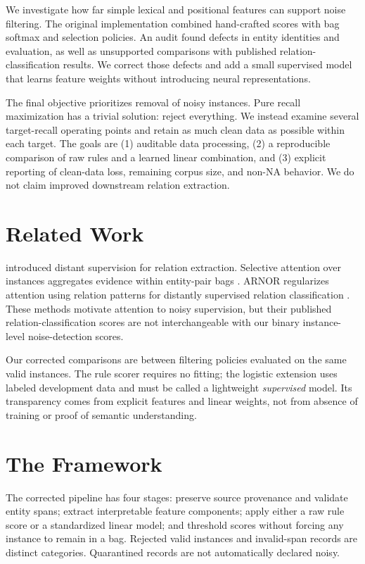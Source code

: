 \documentclass[11pt]{article}
\begin{document}
We investigate how far simple lexical and positional features can support noise filtering. The original implementation combined hand-crafted scores with bag softmax and selection policies. An audit found defects in entity identities and evaluation, as well as unsupported comparisons with published relation-classification results. We correct those defects and add a small supervised model that learns feature weights without introducing neural representations.

The final objective prioritizes removal of noisy instances. Pure recall maximization has a trivial solution: reject everything. We instead examine several target-recall operating points and retain as much clean data as possible within each target. The goals are (1) auditable data processing, (2) a reproducible comparison of raw rules and a learned linear combination, and (3) explicit reporting of clean-data loss, remaining corpus size, and non-NA behavior. We do not claim improved downstream relation extraction.

\section{Related Work}
\citet{mintz-etal-2009-distant} introduced distant supervision for relation extraction. Selective attention over instances aggregates evidence within entity-pair bags \citep{lin-etal-2016-neural}. ARNOR regularizes attention using relation patterns for distantly supervised relation classification \citep{jia-etal-2019-arnor}. These methods motivate attention to noisy supervision, but their published relation-classification scores are not interchangeable with our binary instance-level noise-detection scores.

Our corrected comparisons are between filtering policies evaluated on the same valid instances. The rule scorer requires no fitting; the logistic extension uses labeled development data and must be called a lightweight \emph{supervised} model. Its transparency comes from explicit features and linear weights, not from absence of training or proof of semantic understanding.

\section{The Framework}
The corrected pipeline has four stages: preserve source provenance and validate entity spans; extract interpretable feature components; apply either a raw rule score or a standardized linear model; and threshold scores without forcing any instance to remain in a bag. Rejected valid instances and invalid-span records are distinct categories. Quarantined records are not automatically declared noisy.
\end{document}
